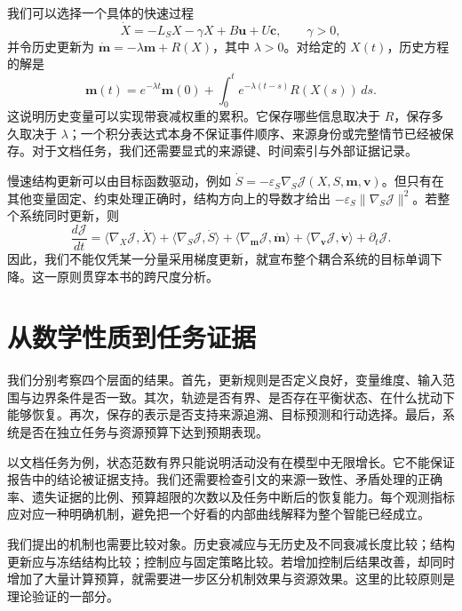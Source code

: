 我们可以选择一个具体的快速过程
\begin{equation}
 \dot X=-L_S X-\gamma X+B\mathbf{u}+U\mathbf{c},\qquad \gamma>0,
\end{equation}
并令历史更新为 $\dot{\mathbf{m}}=-\lambda\mathbf{m}+R(X)$，其中 $\lambda>0$。对给定的 $X(t)$，历史方程的解是
\begin{equation}
 \mathbf{m}(t)=e^{-\lambda t}\mathbf{m}(0)
 +\int_0^t e^{-\lambda(t-s)}R(X(s))\,ds.
\end{equation}
这说明历史变量可以实现带衰减权重的累积。它保存哪些信息取决于 $R$，保存多久取决于 $\lambda$；一个积分表达式本身不保证事件顺序、来源身份或完整情节已经被保存。对于文档任务，我们还需要显式的来源键、时间索引与外部证据记录。

慢速结构更新可以由目标函数驱动，例如 $\dot S=-\varepsilon_S\nabla_S\mathcal J(X,S,\mathbf{m},\mathbf{v})$。但只有在其他变量固定、约束处理正确时，结构方向上的导数才给出 $-\varepsilon_S\|\nabla_S\mathcal J\|^2$。若整个系统同时更新，则
\begin{equation}
 \frac{d\mathcal J}{dt}
 =\langle\nabla_X\mathcal J,\dot X\rangle
 +\langle\nabla_S\mathcal J,\dot S\rangle
 +\langle\nabla_{\mathbf{m}}\mathcal J,\dot{\mathbf{m}}\rangle
 +\langle\nabla_{\mathbf{v}}\mathcal J,\dot{\mathbf{v}}\rangle
 +\partial_t\mathcal J.
\end{equation}
因此，我们不能仅凭某一分量采用梯度更新，就宣布整个耦合系统的目标单调下降。这一原则贯穿本书的跨尺度分析。

\section*{从数学性质到任务证据}
我们分别考察四个层面的结果。首先，更新规则是否定义良好，变量维度、输入范围与边界条件是否一致。其次，轨迹是否有界、是否存在平衡状态、在什么扰动下能够恢复。再次，保存的表示是否支持来源追溯、目标预测和行动选择。最后，系统是否在独立任务与资源预算下达到预期表现。

以文档任务为例，状态范数有界只能说明活动没有在模型中无限增长。它不能保证报告中的结论被证据支持。我们还需要检查引文的来源一致性、矛盾处理的正确率、遗失证据的比例、预算超限的次数以及任务中断后的恢复能力。每个观测指标应对应一种明确机制，避免把一个好看的内部曲线解释为整个智能已经成立。

我们提出的机制也需要比较对象。历史衰减应与无历史及不同衰减长度比较；结构更新应与冻结结构比较；控制应与固定策略比较。若增加控制后结果改善，却同时增加了大量计算预算，就需要进一步区分机制效果与资源效果。这里的比较原则是理论验证的一部分。

